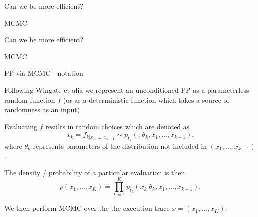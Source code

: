 \begin{frame}{Can we be more efficient?}
  \begin{block}{MCMC}
    
  \end{block}
\end{frame}

\begin{frame}{Can we be more efficient?}
  \begin{block}{MCMC}
    
  \end{block}
\end{frame}

\begin{frame}{PP via MCMC - notation}
  \begin{block}{}
    Following Wingate et alia  we represent an unconditioned PP as a parameterless random function $f$ (or as a deterministic function which takes a source of randomness as an input)
    \newline
    
    Evaluating $f$ results in random choices which are denoted as
    \begin{equation*}
      x_k = f_{k|x_1,\ldots,x_{k-1}} \sim p_{t_k}(.|\theta_{k},x_1,\ldots,x_{k-1}).
    \end{equation*}
    where $\theta_{k}$ represents parameters of the distribution not included in $(x_1,\ldots,x_{k-1})$.
    \newline
    
    The density / probability of a particular evaluation is then
    \begin{equation*}
      p(x_1,\ldots,x_K) = \prod_{k=1}^K p_{t_k}(x_k|\theta_{k},x_1,\ldots,x_{k-1}).
    \end{equation*}
    
    We then perform MCMC over the the execution trace $x = (x_1,\ldots,x_K)$.
    
  \end{block}
\end{frame}

